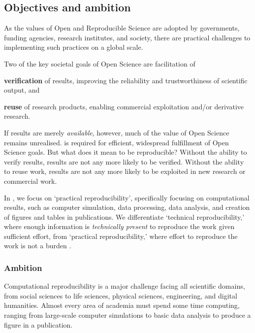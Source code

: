\subsection{Objectives and ambition}

\label{sect:objectives}

As the values of Open and Reproducible Science are adopted by
governments, funding agencies, research institutes, and society,
there are practical challenges to implementing such practices on a global scale.

Two of the key societal goals of Open Science are facilitation of

\begin{compactenum}
\item \textbf{verification} of results, improving the reliability and trustworthiness of scientific output, and
\item \textbf{reuse} of research products, enabling commercial exploitation and/or derivative research.
\end{compactenum}

\noindent If results are merely \emph{available}, however,
much of the value of Open Science remains unrealised.
 is required for efficient, widespread fulfillment of Open Science goals.
But what does it mean to be reproducible?
Without the  ability to verify results, results are not
any more likely to be verified.
Without the  ability to reuse work, results are not
any more likely to be exploited in new research or commercial work.

In \TheProject, we focus on `practical reproducibility',
specifically focusing on computational results, such as computer simulation, data
processing, data analysis, and creation of figures and tables in publications.
We differentiate `technical reproducibility,'
where enough information is \emph{technically present} to reproduce the work given sufficient effort,
from `practical reproducibility,'
where effort to reproduce the work is not a burden \cite{binder}.

\subsubsection{Ambition}

Computational reproducibility is a major challenge facing all scientific domains,
from social sciences to life sciences, physical sciences, engineering, and digital humanities.
Almost every area of academia must spend some time computing,
ranging from large-scale computer simulations to basic data analysis to produce a figure in a publication.

